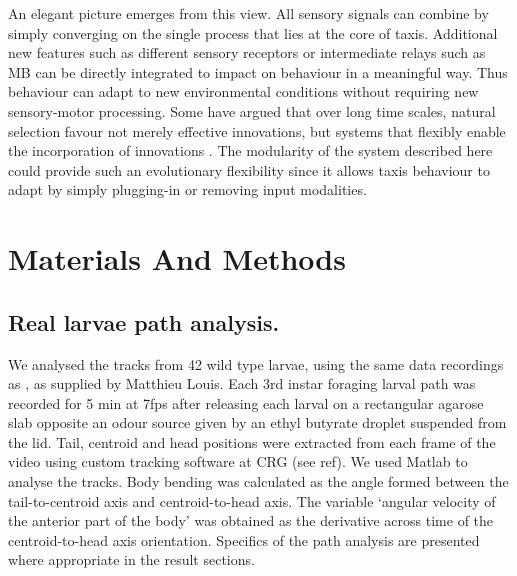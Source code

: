 \documentclass[11pt,a4paper]{article}
\begin{document}
An elegant picture emerges from this view. All sensory signals can combine by simply converging on the single process that lies at the core of taxis. Additional new features such as different sensory receptors or intermediate relays such as MB can be directly integrated to impact on behaviour in a meaningful way. Thus behaviour can adapt to new environmental conditions  without requiring new sensory-motor processing. Some have argued that over long time scales, natural selection favour not merely effective innovations, but systems that flexibly enable the incorporation of innovations \citep{vermeij1973adaptation}. The modularity of the system described here could provide such an evolutionary flexibility since it allows taxis behaviour to adapt by simply plugging-in or removing input modalities. 


\section{Materials And Methods}
\subsection{Real larvae path analysis.}
We analysed the tracks from 42 wild type larvae, using the same data recordings as \cite{gomez2011active}, as supplied by Matthieu Louis. Each 3rd instar foraging larval path was recorded for 5 min at 7fps after releasing each larval on a rectangular agarose slab opposite an odour source given by an ethyl butyrate droplet suspended from the lid. Tail, centroid and head positions were extracted from each frame of the video using custom tracking software at CRG (see ref). We used Matlab to analyse the tracks. Body bending was calculated as the angle formed between the tail-to-centroid axis and centroid-to-head axis. The variable ‘angular velocity of the anterior part of the body’ was obtained as the derivative across time of the centroid-to-head axis orientation. Specifics of the path analysis are presented where appropriate in the result sections. 
\end{document}
